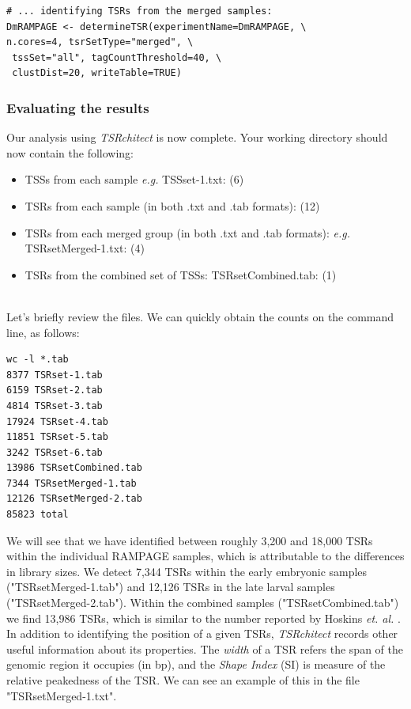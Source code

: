 \documentclass[runningheads,a4paper]{llncs}
\begin{document}
\begin{linenumbers}
\begin{verbatim}
# ... identifying TSRs from the merged samples:
DmRAMPAGE <- determineTSR(experimentName=DmRAMPAGE, \
n.cores=4, tsrSetType="merged", \
 tssSet="all", tagCountThreshold=40, \
 clustDist=20, writeTable=TRUE)
\end{verbatim}

\subsubsection{Evaluating the results}
Our analysis using \textit{TSRchitect} is now complete.
Your working directory should now contain the following: 
\begin{itemize}
\item TSSs from each sample \textit{e.g.} TSSset-1.txt: (6)
\item TSRs from each sample (in both .txt and .tab formats): (12)
\item TSRs from each merged group (in both .txt and .tab formats): \textit{e.g.} TSRsetMerged-1.txt: (4)
\item TSRs from the combined set of TSSs: TSRsetCombined.tab: (1)
\end{itemize} \\

\noindent
Let's briefly review the files. 
We can quickly obtain the counts on the command line, as follows:

\noindent
\begin{verbatim}
wc -l *.tab
8377 TSRset-1.tab
6159 TSRset-2.tab
4814 TSRset-3.tab
17924 TSRset-4.tab
11851 TSRset-5.tab
3242 TSRset-6.tab
13986 TSRsetCombined.tab
7344 TSRsetMerged-1.tab
12126 TSRsetMerged-2.tab
85823 total
\end{verbatim}

\noindent
We will see that we have identified between roughly 3,200 and 18,000 TSRs within the individual RAMPAGE samples, which is attributable to the differences in library sizes. 
We detect 7,344 TSRs within the early embryonic samples ("TSRsetMerged-1.tab") and 12,126 TSRs in the late larval samples ("TSRsetMerged-2.tab").
Within the combined samples ("TSRsetCombined.tab") we find 13,986 TSRs, which is similar to the number reported by Hoskins \textit{et. al.} \cite{Hoskins:2011io}.\\

\noindent
In addition to identifying the position of a given TSRs, \textit{TSRchitect} records other useful information about its properties.
The \textit{width} of a TSR refers the span of the genomic region it occupies (in bp), and the \textit{Shape Index} (SI) is measure of the relative peakedness of the TSR.
We can see an example of this in the file "TSRsetMerged-1.txt".


\end{linenumbers}
\end{document}
